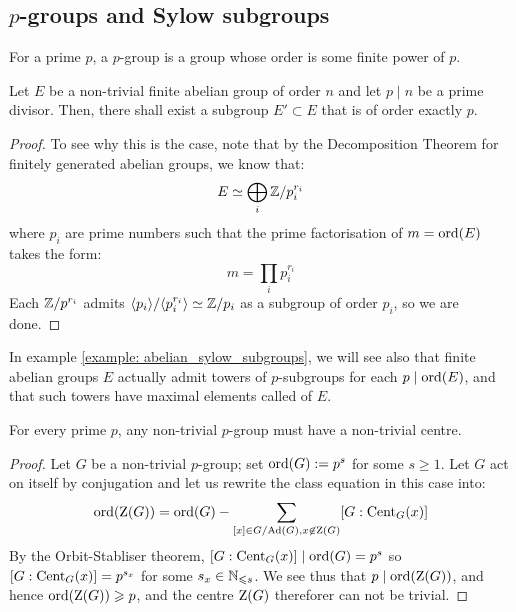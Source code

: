     \subsection{\texorpdfstring{$p$}{}-groups and Sylow subgroups}
        \begin{definition}[$p$-groups] \label{def: p_groups}
            For a prime $p$, a $p$-group is a group whose order is some finite power of $p$.
        \end{definition}
        \begin{lemma} \label{lemma: p_subgroups_of_finite_abelian_groups}
            Let $E$ be a non-trivial finite abelian group of order $n$ and let $p \mid n$ be a prime divisor. Then, there shall exist a subgroup $E' \subset E$ that is of order exactly $p$.
        \end{lemma}
            \begin{proof}
                To see why this is the case, note that by the Decomposition Theorem for finitely generated abelian groups, we know that:
                    $$E \simeq \bigoplus_i \mathbb{Z}/p_i^{r_i}$$
                where $p_i$ are prime numbers such that the prime factorisation of $m = \operatorname{ord}(E)$ takes the form:
                    $$m = \prod_i p_i^{r_i}$$
                Each $\mathbb{Z}/p^{r_i}$ admits $\langle p_i\rangle/\langle p_i^{r_i}\rangle \simeq \mathbb{Z}/p_i$ as a subgroup of order $p_i$, so we are done.
            \end{proof}
        In example \ref{example: abelian_sylow_subgroups}, we will see also that finite abelian groups $E$ actually admit towers of $p$-subgroups for each $p \mid \operatorname{ord}(E)$, and that such towers have maximal elements called  of $E$. 
        \begin{proposition} \label{prop: centres_of_p_groups}
            For every prime $p$, any non-trivial $p$-group must have a non-trivial centre.
        \end{proposition}
            \begin{proof}
                Let $G$ be a non-trivial $p$-group; set $\operatorname{ord}(G) := p^s$ for some $s \geq 1$. Let $G$ act on itself by conjugation and let us rewrite the class equation in this case into:
                    $$\operatorname{ord}( \mathrm{Z}(G) ) = \operatorname{ord}(G) - \sum_{[x] \in G/\mathrm{Ad}(G), x \not \in \mathrm{Z}(G)} [G : \mathrm{Cent}_G(x)]$$
                By the Orbit-Stabliser theorem, $[G : \mathrm{Cent}_G(x)] \mid \operatorname{ord}(G) = p^s$ so $[G : \mathrm{Cent}_G(x)] = p^{s_x}$ for some $s_x \in \mathbb{N}_{\leqslant s}$. We see thus that $p \mid \operatorname{ord}(\mathrm{Z}(G))$, and hence $\operatorname{ord}(\mathrm{Z}(G)) \geqslant p$, and the centre $\mathrm{Z}(G)$ thereforer can not be trivial.
            \end{proof}

